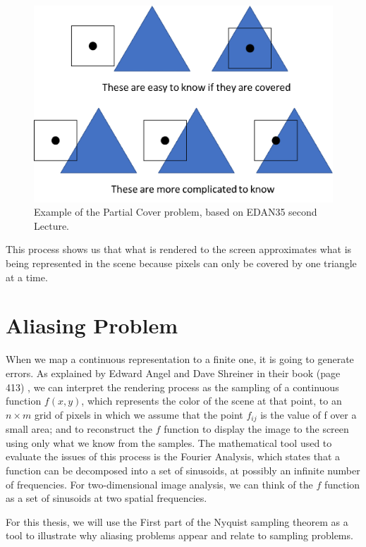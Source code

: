 \documentclass{cslthse-msc}
\begin{document}
\begin{figure}[!hbt]
	\centering
	\includegraphics[scale=0.5]{images/edge_testing.png} 
	\caption{Example of the Partial Cover problem, based on EDAN35 second Lecture. ~\cite{Doggett2017EDAN35}}\label{fig:partialcover}
\end{figure}

This process shows us that what is rendered to the screen approximates what is being represented in the scene because pixels can only be covered by one triangle at a time. \cite{Moller2007, Doggett2017EDAN35}


\section{Aliasing Problem}
When we map a continuous representation to a finite one, it is going to generate errors. As explained by Edward Angel and Dave Shreiner in their book (page 413) \cite{Shreiner2011}, we can interpret the rendering process as the sampling of a continuous function $f(x, y)$, which represents the color of the scene at that point, to an $n\times m$  grid of pixels in which we assume that the point $f_{ij}$  is the value of f over a small area; and to reconstruct the $f$ function to display the image to the screen using only what we know from the samples. The mathematical tool used to evaluate the issues of this process is the Fourier Analysis, which states that a function can be decomposed into a set of sinusoids, at possibly an infinite number of frequencies. For two-dimensional image analysis, we can think of the $f$ function as a set of sinusoids at two spatial frequencies.

For this thesis, we will use the First part of the Nyquist sampling theorem as a tool to illustrate why aliasing problems appear and relate to sampling problems. \\
\end{document}
